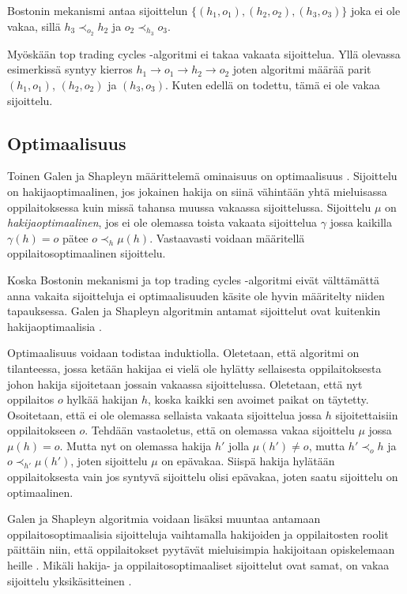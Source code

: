 \documentclass[twoside]{tktltiki}
\begin{document}
Bostonin mekanismi antaa sijoittelun $\{(h_1, o_1), (h_2, o_2), (h_3,
o_3)\}$ joka ei ole vakaa, sillä $h_3 \prec_{o_2} h_2$ ja $o_2
\prec_{h_3} o_3$.

Myöskään top trading cycles -algoritmi ei takaa vakaata sijoittelua.
Yllä olevassa esimerkissä syntyy kierros $h_1 \rightarrow o_1
\rightarrow h_2 \rightarrow o_2$ joten algoritmi määrää parit $(h_1,
o_1)$, $(h_2, o_2)$ ja $(h_3, o_3)$. Kuten edellä on todettu, tämä ei
ole vakaa sijoittelu.

\subsection{Optimaalisuus}

Toinen Galen ja Shapleyn määrittelemä ominaisuus on optimaalisuus
\cite{galeshapley62}. Sijoittelu on hakijaoptimaalinen, jos jokainen
hakija on siinä vähintään yhtä mieluisassa oppilaitoksessa kuin missä
tahansa muussa vakaassa sijoittelussa. Sijoittelu $\mu$ on
\emph{hakijaoptimaalinen}, jos ei ole olemassa toista vakaata
sijoittelua $\gamma$ jossa kaikilla $\gamma(h) = o$ pätee $o \prec_h
\mu(h)$. Vastaavasti voidaan määritellä oppilaitosoptimaalinen
sijoittelu.
\newpage

Koska Bostonin mekanismi ja top trading cycles -algoritmi eivät
välttämättä anna vakaita sijoitteluja ei optimaalisuuden käsite ole
hyvin määritelty niiden tapauksessa. Galen ja Shapleyn algoritmin
antamat sijoittelut ovat kuitenkin hakijaoptimaalisia
\cite{galeshapley62}.

Optimaalisuus voidaan todistaa induktiolla. Oletetaan, että algoritmi
on tilanteessa, jossa ketään hakijaa ei vielä ole hylätty sellaisesta
oppilaitoksesta johon hakija sijoitetaan jossain vakaassa
sijoittelussa. Oletetaan, että nyt oppilaitos $o$ hylkää hakijan $h$,
koska kaikki sen avoimet paikat on täytetty. Osoitetaan, että ei ole
olemassa sellaista vakaata sijoittelua jossa $h$ sijoitettaisiin
oppilaitokseen $o$. Tehdään vastaoletus, että on olemassa vakaa
sijoittelu $\mu$ jossa $\mu(h) = o$. Mutta nyt on olemassa hakija $h'$
jolla $\mu(h') \neq o$, mutta $h' \prec_o h$ ja $o \prec_{h'}
\mu(h')$, joten sijoittelu $\mu$ on epävakaa. Siispä hakija hylätään
oppilaitoksesta vain jos syntyvä sijoittelu olisi epävakaa, joten
saatu sijoittelu on optimaalinen.

Galen ja Shapleyn algoritmia voidaan lisäksi muuntaa antamaan
oppilaitosoptimaalisia sijoitteluja vaihtamalla hakijoiden ja
oppilaitosten roolit päittäin niin, että oppilaitokset pyytävät
mieluisimpia hakijoitaan opiskelemaan heille \cite{galeshapley62}.
Mikäli hakija- ja oppilaitosoptimaaliset sijoittelut ovat samat, on
vakaa sijoittelu yksikäsitteinen \cite{galeshapley62}.
\end{document}
